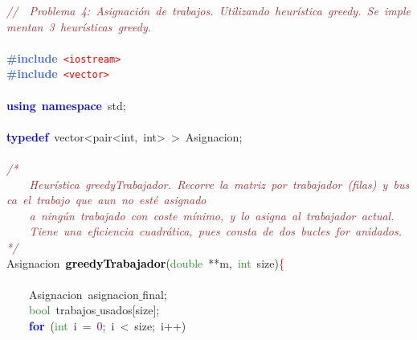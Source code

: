 \noindent
\mbox{}\textit{\textcolor{Brown}{//\ \ Problema\ 4:\ Asignación\ de\ trabajos.\ Utilizando\ heurística\ greedy.\ Se\ implementan\ 3\ heurísticas\ greedy.\ }} \\
\mbox{} \\
\mbox{}\textbf{\textcolor{RoyalBlue}{\#include}}\ \texttt{\textcolor{Red}{\textless{}iostream\textgreater{}}} \\
\mbox{}\textbf{\textcolor{RoyalBlue}{\#include}}\ \texttt{\textcolor{Red}{\textless{}vector\textgreater{}}} \\
\mbox{} \\
\mbox{}\textbf{\textcolor{Blue}{using}}\ \textbf{\textcolor{Blue}{namespace}}\ std\textcolor{BrickRed}{;} \\
\mbox{} \\
\mbox{}\textbf{\textcolor{Blue}{typedef}}\ \textcolor{TealBlue}{vector\textless{}pair\textless{}int,\ int\textgreater{}\ \textgreater{}}\ Asignacion\textcolor{BrickRed}{;} \\
\mbox{} \\
\mbox{}\textit{\textcolor{Brown}{/*\ }} \\
\mbox{}\textit{\textcolor{Brown}{\ \ \ \ Heurística\ greedyTrabajador.\ Recorre\ la\ matriz\ por\ trabajador\ (filas)\ y\ busca\ el\ trabajo\ que\ aun\ no\ esté\ asignado\ }} \\
\mbox{}\textit{\textcolor{Brown}{\ \ \ \ a\ ningún\ trabajado\ con\ coste\ mínimo,\ y\ lo\ asigna\ al\ trabajador\ actual.\ }} \\
\mbox{}\textit{\textcolor{Brown}{\ \ \ \ Tiene\ una\ eficiencia\ cuadrática,\ pues\ consta\ de\ dos\ bucles\ for\ anidados.}} \\
\mbox{}\textit{\textcolor{Brown}{*/}} \\
\mbox{}\textcolor{TealBlue}{Asignacion}\ \textbf{\textcolor{Black}{greedyTrabajador}}\textcolor{BrickRed}{(}\textcolor{ForestGreen}{double}\ \textcolor{BrickRed}{**}m\textcolor{BrickRed}{,}\ \textcolor{ForestGreen}{int}\ size\textcolor{BrickRed}{)}\textcolor{Red}{\{} \\
\mbox{}\ \ \ \  \\
\mbox{}\ \ \ \ \textcolor{TealBlue}{Asignacion}\ asignacion$\_$final\textcolor{BrickRed}{;}\  \\
\mbox{}\ \ \ \ \textcolor{ForestGreen}{bool}\ trabajos$\_$usados\textcolor{BrickRed}{[}size\textcolor{BrickRed}{];}\  \\
\mbox{}\ \ \ \ \textbf{\textcolor{Blue}{for}}\ \textcolor{BrickRed}{(}\textcolor{ForestGreen}{int}\ i\ \textcolor{BrickRed}{=}\ \textcolor{Purple}{0}\textcolor{BrickRed}{;}\ i\ \textcolor{BrickRed}{\textless{}}\ size\textcolor{BrickRed}{;}\ i\textcolor{BrickRed}{++)} \\
